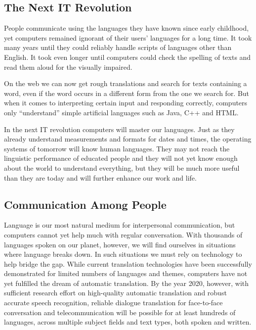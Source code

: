\documentclass[10pt, plain]{../../metanetpaper}
\begin{document}
\clearpage


\label{sec:lt2020}

\begin{multicols}{2}
\subsection{The Next IT Revolution}
\label{sec:introduction-vision}

People communicate using the languages they have known since early childhood, yet computers remained ignorant of their users’ languages for a long time. It took many years until they could reliably handle scripts of languages other than English. It took even longer until computers could check the spelling of texts and read them aloud for the visually impaired.
 
On the web we can now get rough translations and search for texts containing a word, even if the word occurs in a different form from the one we search for. But when it comes to interpreting certain input and responding correctly, computers only “understand” simple artificial languages such as Java, C++ and HTML.
 
In the next IT revolution computers will master our languages. Just as they already understand measurements and formats for dates and times, the operating systems of tomorrow will know human languages. They may not reach the linguistic performance of educated people and they will not yet know enough about the world to understand everything, but they will be much more useful than they are today and will further enhance our work and life.

\subsection{Communication Among People}
\label{sec:comm-among-people}

Language is our most natural medium for interpersonal communication, but computers cannot yet help much with regular conversation. With thousands of languages spoken on our planet, however, we will find ourselves in situations where language breaks down. In such situations we must rely on technology to help bridge the gap. While current translation technologies have been successfully demonstrated for limited numbers of languages and themes, computers have not yet fulfilled the dream of automatic translation. By the year 2020, however, with sufficient research effort on high-quality automatic translation and robust accurate speech recognition, reliable dialogue translation for face-to-face conversation and telecommunication will be possible for at least hundreds of languages, across multiple subject fields and text types, both spoken and written.


\end{multicols}
\end{document}
